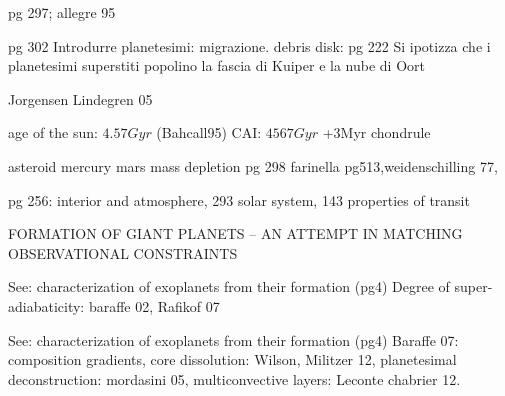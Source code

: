 \begin{workout}
pg 297; allegre 95
\end{workout}

\begin{workout}
pg 302
Introdurre planetesimi: migrazione.
debris disk: pg 222
Si ipotizza che i planetesimi superstiti popolino la fascia di Kuiper e la nube di Oort

\end{workout}

\begin{workout}
Jorgensen Lindegren 05
\end{workout}

\begin{workout}
age of the sun: $4.57Gyr$ (Bahcall95)
CAI: $4567Gyr$ +3Myr chondrule
\end{workout}

\begin{workout}
asteroid mercury mars mass depletion pg 298
farinella pg513,weidenschilling 77,

\end{workout}

\begin{workout}
pg 256: interior and atmosphere, 293 solar system, 143 properties of transit
\end{workout}


\begin{workout}
FORMATION OF GIANT PLANETS – AN ATTEMPT IN MATCHING OBSERVATIONAL CONSTRAINTS
\end{workout}

\begin{workout}
See: characterization of exoplanets from their formation (pg4)
Degree of super-adiabaticity: baraffe 02, Rafikof 07
\end{workout}

\begin{workout}
See: characterization of exoplanets from their formation (pg4)
Baraffe 07: composition gradients, core dissolution: Wilson, Militzer 12, planetesimal deconstruction: mordasini 05, multiconvective layers: Leconte chabrier 12.
\end{workout}

